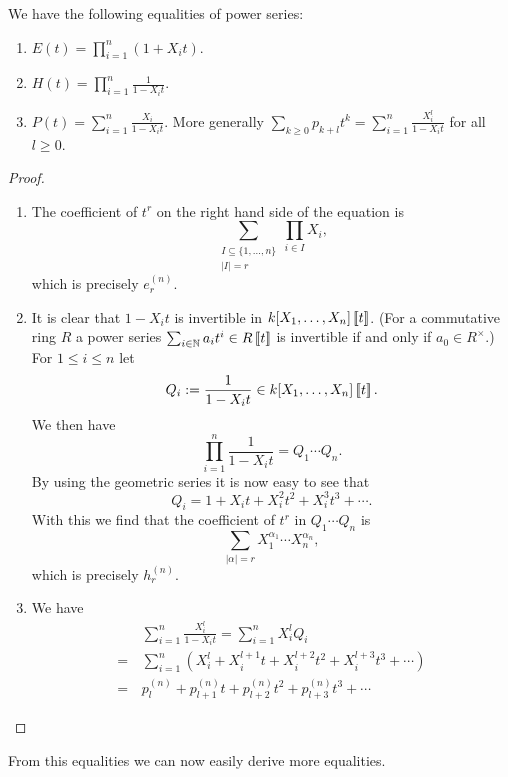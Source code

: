 \begin{prop}
 We have the following equalities of power series:
 \begin{enumerate}[1)]
  \item
   $E(t) = \prod_{i=1}^n (1 + X_i t)$.
  \item
   $H(t) = \prod_{i=1}^n \frac{1}{1 - X_i t}$.
  \item
   $P(t) = \sum_{i=1}^n \frac{X_i}{1 - X_i t}$. More generally $\sum_{k \geq 0} p_{k+l} t^k = \sum_{i=1}^n \frac{X_i^l}{1 - X_i t}$ for all $l \geq 0$.
 \end{enumerate}
\end{prop}
\begin{proof}
 \begin{enumerate}[1)]
  \item
   The coefficient of $t^r$ on the right hand side of the equation is
   \[
    \sum_{\substack{I \subseteq \{1, \dotsc, n\} \\ |I| = r}} \prod_{i \in I} X_i,
   \]
   which is precisely $e^{(n)}_r$.
  \item
   It is clear that $1-X_i t$ is invertible in $k[X_1, \dotsc, X_n]\left[\!\left[t\right]\!\right]$. (For a commutative ring $R$ a power series $\sum_{i \in \mathbb{N}} a_i t^i \in R\left[\!\left[t\right]\!\right]$ is invertible if and only if $a_0 \in R^\times$.) For $1 \leq i \leq n$ let
   \[
    Q_i := \frac{1}{1-X_i t} \in k[X_1, \dotsc, X_n] \left[\!\left[t\right]\!\right].
   \]
   We then have
   \[
    \prod_{i=1}^n \frac{1}{1-X_i t} = Q_1 \dotsm Q_n.
   \]
   By using the geometric series it is now easy to see that
   \[
    Q_i = 1 + X_i t + X_i^2 t^2 + X_i^3 t^3 + \dotsb.
   \]
   With this we find that the coefficient of $t^r$ in $Q_1 \dotsm Q_n$ is
   \[
    \sum_{|\alpha| = r} X_1^{\alpha_1} \dotsm X_n^{\alpha_n},
   \]
   which is precisely $h^{(n)}_r$.
  \item
   We have
   \begin{align*}
     &\, \sum_{i=1}^n \frac{X_i^l}{1-X_i t}
    =    \sum_{i=1}^n X_i^l Q_i \\
    =&\, \sum_{i=1}^n (X_i^l + X_i^{l+1} t + X_i^{l+2} t^2 + X_i^{l+3} t^3 + \dotsb) \\
    =&\, p^{(n)}_l + p^{(n)}_{l+1} t + p^{(n)}_{l+2} t^2 + p^{(n)}_{l+3} t^3 + \dotsb
   \end{align*}\qedhere
 \end{enumerate}
\end{proof}


From this equalities we can now easily derive more equalities.



